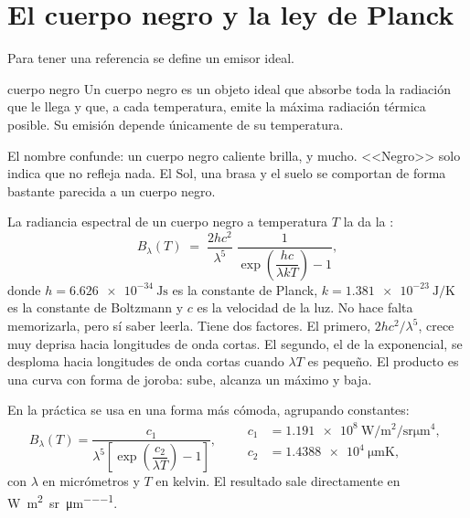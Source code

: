 \section{El cuerpo negro y la ley de Planck}

Para tener una referencia se define un emisor ideal.

\begin{definicion}{cuerpo negro}
Un cuerpo negro es un objeto ideal que absorbe toda la radiación que le llega y que, a cada
temperatura, emite la máxima radiación térmica posible. Su emisión depende únicamente de su
temperatura.
\end{definicion}

El nombre confunde: un cuerpo negro caliente brilla, y mucho. <<Negro>> solo indica que no
refleja nada. El Sol, una brasa y el suelo se comportan de forma bastante parecida a un cuerpo
negro.

La radiancia espectral de un cuerpo negro a temperatura $T$ la da la :
\begin{equation}\label{eq:planck}
  B_\lambda(T) \;=\; \frac{2hc^2}{\lambda^5}\;\frac{1}{\exp\!\left(\dfrac{hc}{\lambda k T}\right)-1},
\end{equation}
donde $h = \SI{6.626e-34}{\joule\second}$ es la constante de Planck,
$k = \SI{1.381e-23}{\joule\per\kelvin}$ es la constante de Boltzmann y $c$ es la velocidad de la
luz. No hace falta memorizarla, pero sí saber leerla. Tiene dos factores. El primero,
$2hc^2/\lambda^5$, crece muy deprisa hacia longitudes de onda cortas. El segundo, el de la
exponencial, se desploma hacia longitudes de onda cortas cuando $\lambda T$ es pequeño. El
producto es una curva con forma de joroba: sube, alcanza un máximo y baja.

En la práctica se usa en una forma más cómoda, agrupando constantes:
\begin{equation}\label{eq:planck-practica}
  B_\lambda(T) = \frac{c_1}{\lambda^5\left[\exp\!\left(\dfrac{c_2}{\lambda T}\right)-1\right]},
  \qquad
  \begin{aligned}
  c_1 &= \SI{1.191e8}{\watt\per\square\metre\per\steradian\micro\metre\tothe{4}},\\
  c_2 &= \SI{1.4388e4}{\micro\metre\kelvin},
  \end{aligned}
\end{equation}
con $\lambda$ en micrómetros y $T$ en kelvin. El resultado sale directamente en
\si{\watt\per\square\metre\per\steradian\per\micro\metre}.

